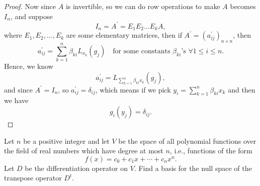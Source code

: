 \begin{proof}
    Now since \(A\) is invertible, so we can do row operations to make \(A\) becomes \(I_n\), and suppose 
    \[
        I_n = A^{\prime} = E_1 E_2 \dots E_k A, 
    \] where \(E_1, E_2, \dots , E_k\) are some elementary matrices, then if \(A^{\prime} = \left( a_{ij}^{\prime}  \right)_{n \times n} \), then 
    \[
        a _{ij}^{\prime} = \sum_{k=1}^n \beta _{ki} L_{x_k} (g_j) \quad \text{for some constants } \beta _{ki}\text{'s } \forall 1 \le i \le n.
    \] Hence, we know 
    \[
        a_{ij}^{\prime} = L_{\sum_{k=1}^n \beta _{ki} x_k } (g_j),
    \] and since \(A^{\prime} = I_n\), so \(a_{ij}^{\prime} = \delta _{ij}\), which means if we pick \(y_i = \sum_{k=1}^n \beta _{ki}x_k \) and then we have
    \[
        g_i(y_j) = \delta _{ij}. 
    \]
\end{proof}

\begin{problem}
Let $n$ be a positive integer and let $V$ be the space of all polynomial functions over the field of real numbers which have degree at most $n$, i.e., functions of the form
\[
f(x) = c_0 + c_1 x + \cdots + c_n x^n.
\]
Let $D$ be the differentiation operator on $V$. Find a basis for the null space of the transpose operator $D^{t}$.
\end{problem}
